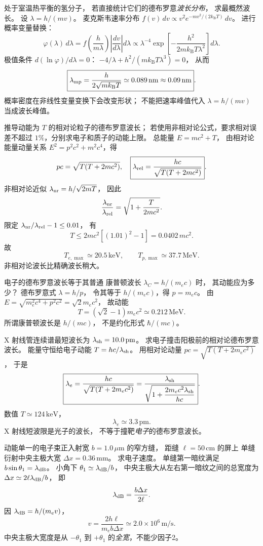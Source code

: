 处于室温热平衡的氢分子，
若直接统计它们的德布罗意\emph{波长分布}，
求最概然波长。
\exsolution
设 $\lambda=h/(mv)$。
麦克斯韦速率分布
$f(v)\,dv\propto
v^2e^{-mv^2/(2k_{\mathrm B}T)}\,dv$。
进行概率变量替换：
\[
 \varphi(\lambda)\,d\lambda
 =f\!\left(\frac h{m\lambda}\right)
 \left|\frac{dv}{d\lambda}\right|d\lambda
 \propto\lambda^{-4}
 \exp\!\left[-\frac{h^2}
 {2mk_{\mathrm B}T\lambda^2}\right]d\lambda.
\]
极值条件 $d(\ln\varphi)/d\lambda=0$：
$-4/\lambda+h^2/(mk_{\mathrm B}T\lambda^3)=0$，
从而
\[
 \boxed{\lambda_{\rm mp}=
 \frac h{2\sqrt{mk_{\mathrm B}T}}
 \simeq0.089\,\mathrm{nm}\approx0.09\,\mathrm{nm}}.
\]
\excheck 概率密度在非线性变量变换下会改变形状；
不能把速率峰值代入 $\lambda=h/(mv)$ 当成波长峰值。

推导动能为 $T$ 的相对论粒子的德布罗意波长；
若使用非相对论公式，要求相对误差不超过
$1\%$，分别求电子和质子的动能上限。
\exsolution
总能量 $E=mc^2+T$，
由相对论能量动量关系
$E^2=p^2c^2+m^2c^4$，得
\[
 pc=\sqrt{T(T+2mc^2)},\quad
 \boxed{\lambda_{\rm rel}=
 \frac{hc}{\sqrt{T(T+2mc^2)}}}.
\]
非相对论近似
$\lambda_{\rm nr}=h/\sqrt{2mT}$，
因此
\[
 \frac{\lambda_{\rm nr}}{\lambda_{\rm rel}}
 =\sqrt{1+\frac T{2mc^2}}.
\]
限定
$\lambda_{\rm nr}/\lambda_{\rm rel}-1\le0.01$，
有
\[
 \boxed{T\le2mc^2[(1.01)^2-1]
 =0.0402\,mc^2}.
\]
故
\[
 \boxed{T_{e,\max}\simeq20.5\,\mathrm{keV}},\qquad
 \boxed{T_{p,\max}\simeq37.7\,\mathrm{MeV}}.
\]
非相对论波长比精确波长稍大。

电子的德布罗意波长等于其普通
康普顿波长 $\lambda_C=h/(m_ec)$ 时，
其动能应为多少？
\exsolution
德布罗意式 $\lambda=h/p$，
令其等于 $h/(m_ec)$，得
$p=m_ec$。
由
$E=\sqrt{m_e^2c^4+p^2c^2}=\sqrt2m_ec^2$，
故动能
\[
 \boxed{T=(\sqrt2-1)m_ec^2
 \simeq0.212\,\mathrm{MeV}}.
\]
\excheck 所谓康普顿波长是 $h/(mc)$，
不是约化形式 $\hbar/(mc)$。

X 射线管连续谱最短波长为
$\lambda_{\rm sh}=10.0\,\mathrm{pm}$。
求电子撞击阳极前的相对论德布罗意波长。
\exsolution
能量守恒给电子动能
$T=hc/\lambda_{\rm sh}$。
用相对论动量
$pc=\sqrt{T(T+2m_ec^2)}$，
于是
\[
 \boxed{\lambda_e=
 \frac{hc}{\sqrt{T(T+2m_ec^2)}}
 =\frac{\lambda_{\rm sh}}
 {\sqrt{1+\dfrac{2m_ec^2\lambda_{\rm sh}}{hc}}}}.
\]
数值 $T\simeq124\,\mathrm{keV}$，
\[
 \boxed{\lambda_e\simeq3.3\,\mathrm{pm}}.
\]
\excheck X 射线短波限是光子的波长，
不等于撞靶\emph{电子}的德布罗意波长。

动能单一的电子束正入射宽
$b=1.0\,\mu\mathrm m$ 的窄方缝，
距缝 $\ell=50\,\mathrm{cm}$ 的屏上
单缝衍射中央主极大宽
$\Delta x=0.36\,\mathrm{mm}$。
求电子速度。
\exsolution
单缝第一暗纹满足
$b\sin\theta_1=\lambda_{\rm dB}$。
小角下 $\theta_1\simeq\lambda_{\rm dB}/b$，
中央主极大从左右第一暗纹之间的总宽度为
$\Delta x\simeq2\ell\lambda_{\rm dB}/b$，
即
\[
 \lambda_{\rm dB}=\frac{b\Delta x}{2\ell}.
\]
因 $\lambda_{\rm dB}=h/(m_ev)$，
\[
 \boxed{v=\frac{2h\ell}{m_eb\Delta x}
 \simeq2.0\times10^6\,\mathrm{m/s}}.
\]
\excheck 中央主极大宽度是从 $-\theta_1$ 到
$+\theta_1$ 的\emph{全宽}，不能少因子2。

